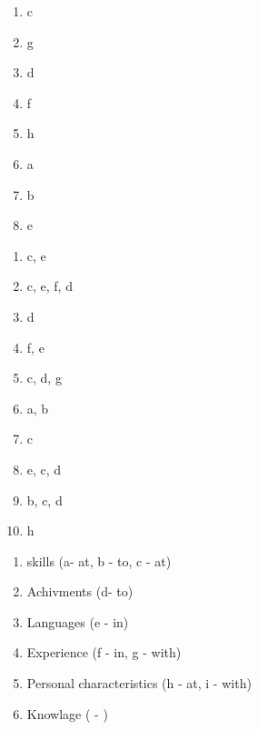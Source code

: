 \documentclass[a4paper,14pt]{extreport}
\begin{document}
\pagecolor{white}

\begin{center}\end{center}\par
\vspace{1cm}



\begin{multicols}{2}
    \begin{enumerate}
    \item c
    \item g
    \item d
    \item f
    \item h
    \item a
    \item b
    \item e
    \end{enumerate}
\end{multicols}

\vspace{1cm}
\begin{multicols}{3}
    \begin{enumerate}
    \item c, e
    \item c, e, f, d
    \item d
    \item f, e
    \item c, d, g
    \item a, b
    \item c
    \item e, c, d
    \item b, c, d 
    \item h
    \end{enumerate}
\end{multicols}

\vspace{1cm}
\begin{multicols}{2}
    \begin{enumerate}
    \item skills (a- at, b - to, c - at)
    \item Achivments (d- to)
    \item Languages (e - in)
    \item Experience (f - in, g - with)
    \item Personal characteristics (h - at, i - with)
    \item Knowlage ( - )
    \end{enumerate}
\end{multicols}
\end{document}
